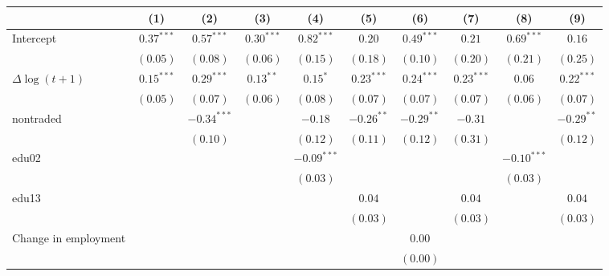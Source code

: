 
\begin{tabular}{l c c c c c c c c c }
\hline
 & (1) & (2) & (3) & (4) & (5) & (6) & (7) & (8) & (9) \\
\hline
Intercept          & $0.37^{***}$ & $0.57^{***}$  & $0.30^{***}$ & $0.82^{***}$  & $0.20$       & $0.49^{***}$ & $0.21$       & $0.69^{***}$  & $0.16$       \\
                     & $(0.05)$     & $(0.08)$      & $(0.06)$     & $(0.15)$      & $(0.18)$     & $(0.10)$     & $(0.20)$     & $(0.21)$      & $(0.25)$     \\
$\Delta \log(t+1)$              & $0.15^{***}$ & $0.29^{***}$  & $0.13^{**}$  & $0.15^{*}$    & $0.23^{***}$ & $0.24^{***}$ & $0.23^{***}$ & $0.06$        & $0.22^{***}$ \\
                     & $(0.05)$     & $(0.07)$      & $(0.06)$     & $(0.08)$      & $(0.07)$     & $(0.07)$     & $(0.07)$     & $(0.06)$      & $(0.07)$     \\
nontraded            &              & $-0.34^{***}$ &              & $-0.18$       & $-0.26^{**}$ & $-0.29^{**}$ & $-0.31$      &               & $-0.29^{**}$ \\
                     &              & $(0.10)$      &              & $(0.12)$      & $(0.11)$     & $(0.12)$     & $(0.31)$     &               & $(0.12)$     \\
edu02                &              &               &              & $-0.09^{***}$ &              &              &              & $-0.10^{***}$ &              \\
                     &              &               &              & $(0.03)$      &              &              &              & $(0.03)$      &              \\
edu13                &              &               &              &               & $0.04$       &              & $0.04$       &               & $0.04$       \\
                     &              &               &              &               & $(0.03)$     &              & $(0.03)$     &               & $(0.03)$     \\
Change in employment              &              &               &              &               &              & $0.00$       &              &               &              \\
                     &              &               &              &               &              & $(0.00)$     &              &               &              \\

\end{tabular}
